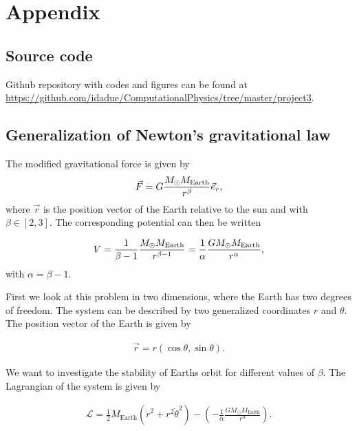 \documentclass[../main.tex]{subfiles}
\begin{document}
\appendix
\renewcommand{\theequation}{A\arabic{equation}}
\setcounter{equation}{0}
\section{Appendix}
\subsection{Source code}
Github repository with codes and figures can be found at \url{https://github.com/idadue/ComputationalPhysics/tree/master/project3}.

\subsection{Generalization of Newton's gravitational law}\label{sec:appendix_generalized_grav_law}
The modified gravitational force is given by 
\begin{align}
    \vec{F}=G\frac{M_{\odot} M_{\textnormal{\text{Earth}}}}{r^{\beta}}\vec{e}_r,
\label{eq:gravity-generalized}
\end{align} where \ensuremath{\vec{r}} is the position vector of the Earth relative to the sun and with \ensuremath{\beta \in [2,3]}. The corresponding potential can then be written

\begin{align}
    V = \frac{1}{\beta-1}\frac{M_{\odot} M_{\textnormal{\text{Earth}}}}{r^{\beta-1}}=\frac{1}{\alpha}\frac{GM_{\odot} M_{\text{Earth}}}{r^{\alpha}}, 
\end{align} with \ensuremath{\alpha = \beta - 1}. 

First we look at this problem in two dimensions, where the Earth has two degrees of freedom. The system can be described by two generalized coordinates \ensuremath{r} and \ensuremath{\theta}. The position vector of the Earth is given by

\begin{align*}
    \vec{r}=r(\cos\theta,\sin\theta).
\end{align*}

We want to investigate the stability of Earths orbit for different values of \ensuremath{\beta}. The Lagrangian of the system is given by

\begin{align*}
    \mathcal{L}=\frac{1}{2}M_{\text{Earth}}(\dot{r}^2+r^2\dot{\theta}^2)-\left(-\frac{1}{\alpha}\frac{GM_{\odot} M_{\text{Earth}}}{r^{\alpha}}\right).
\end{align*}
\end{document}
